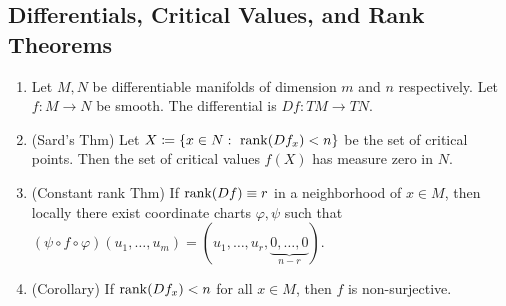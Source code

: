 \subsection{Differentials, Critical Values, and Rank Theorems}
\begin{enumerate}
    \item Let $M, N$ be differentiable manifolds of dimension $m$ and $n$ respectively. Let $f: M \to N$ be smooth. The differential is $Df: TM \to TN$. 
    \item (Sard's Thm) Let $X \coloneqq \{x \in N :\ \operatorname{rank}(Df_x) < n \}$ be the set of critical points. Then the set of critical values $f(X)$ has measure zero in $N$.
    \item (Constant rank Thm) If $\operatorname{rank}(Df) \equiv r$ in a neighborhood of $x\in M$, then locally there exist coordinate charts $\varphi, \psi$ such that $(\psi \circ f \circ \varphi)(u_1,\dots,u_m) = (u_1,\dots,u_r,\underbrace{0,\dots,0}_{n-r})$.
    \item (Corollary) If $\operatorname{rank}(Df_x) < n$ for all $x\in M$, then $f$ is non-surjective.
\end{enumerate}

